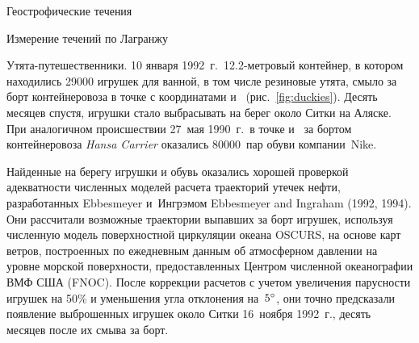 \begin{chapter}{Геострофические течения}
\begin{section}{Измерение течений по Лагранжу}
\begin{paragraph}{Утята-путешественники.}
10 января 1992~г.\ 12.2-метровый контейнер, в котором находились 29000 
игрушек для ванной, в том числе резиновые утята, смыло за борт 
контейнеровоза в точке с координатами  и~
(рис.~\ref{fig:duckies}). Десять месяцев спустя, игрушки стало выбрасывать на
берег около Ситки на Аляске. При аналогичном происшествии 27~мая 1990~г.\ 
в точке  и~ за бортом контейнеровоза 
\textit{Hansa Carrier} оказались 80000~пар обуви компании~Nike. 
%

Найденные на берегу игрушки 
и обувь оказались хорошей проверкой адекватности численных моделей расчета
траекторий утечек нефти, разработанных Ebbesmeyer и~Ингрэмом
Ebbesmeyer and Ingraham (1992, 1994). 
Они рассчитали возможные траектории выпавших за борт игрушек,
используя численную модель поверхностной циркуляции океана OSCURS,
на основе карт ветров, построенных по ежедневным данным об атмосферном
давлении на уровне морской поверхности, предоставленных Центром численной
океанографии ВМФ США (FNOC). После коррекции расчетов с учетом
увеличения парусности игрушек на 50\% и уменьшения угла отклонения
на~${5}^\circ$, они точно предсказали появление выброшенных 
игрушек
около Ситки 16~ноября 1992~г., десять месяцев после их смыва за
борт.
%
\end{paragraph}
\end{section}



\end{chapter}
